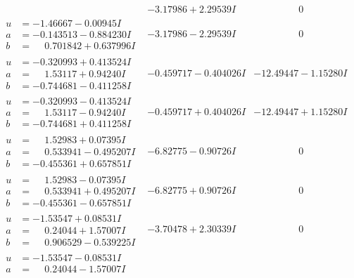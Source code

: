 \documentclass[1p]{elsarticle_modified}
\theoremstyle{definition}
\begin{document}
$$\begin{array}{c|c|c}
 & -3.17986 + 2.29539 I & \phantom{-0.000000 } 0 \\ \hline\begin{aligned}
u &= -1.46667 - 0.00945 I \\
a &= -0.143513 - 0.884230 I \\
b &= \phantom{-}0.701842 + 0.637996 I\end{aligned}
 & -3.17986 - 2.29539 I & \phantom{-0.000000 } 0 \\ \hline\begin{aligned}
u &= -0.320993 + 0.413524 I \\
a &= \phantom{-}1.53117 + 0.94240 I \\
b &= -0.744681 - 0.411258 I\end{aligned}
 & -0.459717 - 0.404026 I & -12.49447 - 1.15280 I \\ \hline\begin{aligned}
u &= -0.320993 - 0.413524 I \\
a &= \phantom{-}1.53117 - 0.94240 I \\
b &= -0.744681 + 0.411258 I\end{aligned}
 & -0.459717 + 0.404026 I & -12.49447 + 1.15280 I \\ \hline\begin{aligned}
u &= \phantom{-}1.52983 + 0.07395 I \\
a &= \phantom{-}0.533941 - 0.495207 I \\
b &= -0.455361 + 0.657851 I\end{aligned}
 & -6.82775 - 0.90726 I & \phantom{-0.000000 } 0 \\ \hline\begin{aligned}
u &= \phantom{-}1.52983 - 0.07395 I \\
a &= \phantom{-}0.533941 + 0.495207 I \\
b &= -0.455361 - 0.657851 I\end{aligned}
 & -6.82775 + 0.90726 I & \phantom{-0.000000 } 0 \\ \hline\begin{aligned}
u &= -1.53547 + 0.08531 I \\
a &= \phantom{-}0.24044 + 1.57007 I \\
b &= \phantom{-}0.906529 - 0.539225 I\end{aligned}
 & -3.70478 + 2.30339 I & \phantom{-0.000000 } 0 \\ \hline\begin{aligned}
u &= -1.53547 - 0.08531 I \\
a &= \phantom{-}0.24044 - 1.57007 I \\

\end{aligned}
\end{array}$$
\end{document}
